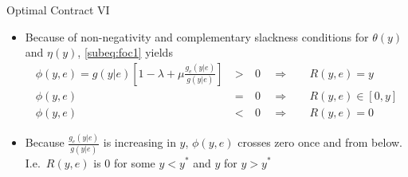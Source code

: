 \documentclass[compress]{beamer}
\begin{document}
\begin{frame}[c]{Optimal Contract VI}
  \begin{itemize}[<+- | alert@+>]
    \item Because of non-negativity and complementary slackness conditions for $\theta(y)$ and $\eta(y)$, \cref{subeq:foc1} yields
          \begin{subequations}
            \label{eq:KT-analysis}
            \begin{alignat*}{3}
              \phi(y,e) = g(y|e)\left[1-\lambda+\mu \frac{g_e(y|e)}{g(y|e)}\right]
                        & \: > \: & 0 & \enspace \Rightarrow &   & \enspace R(y,e)=y        \\
              \phi(y,e) & \: = \: & 0 & \enspace \Rightarrow &   & \enspace R(y,e)\in [0,y] \\
              \phi(y,e) & \: < \: & 0 & \enspace \Rightarrow &   & \enspace R(y,e) =0       
            \end{alignat*}
          \end{subequations}
    \item Because $\frac{g_e(y|e)}{g(y|e)}$ is increasing in $y$, $\phi(y,e)$ crosses zero once and from below. I.e.\ $R(y,e)$ is $0$ for some $y<y^*$ and $y$ for $y>y^{*}$
  \end{itemize}
\end{frame}
\end{document}
